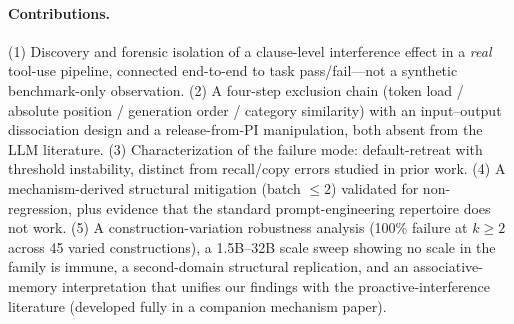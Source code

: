 \paragraph{Contributions.}
(1) Discovery and forensic isolation of a clause-level interference effect in a \emph{real} tool-use pipeline,
connected end-to-end to task pass/fail---not a synthetic benchmark-only observation. (2) A four-step exclusion
chain (token load / absolute position / generation order / category similarity) with an input--output
dissociation design and a release-from-PI manipulation, both absent from the LLM literature. (3)
Characterization of the failure mode: default-retreat with threshold instability, distinct from recall/copy
errors studied in prior work. (4) A mechanism-derived structural mitigation (batch $\le 2$) validated for
non-regression, plus evidence that the standard prompt-engineering repertoire does not work. (5) A
construction-variation robustness analysis (100\% failure at $k \ge 2$ across 45 varied constructions), a
1.5B--32B scale sweep showing no scale in the family is immune, a second-domain structural replication, and an
associative-memory interpretation that unifies our findings with the proactive-interference literature
(developed fully in a companion mechanism paper).
